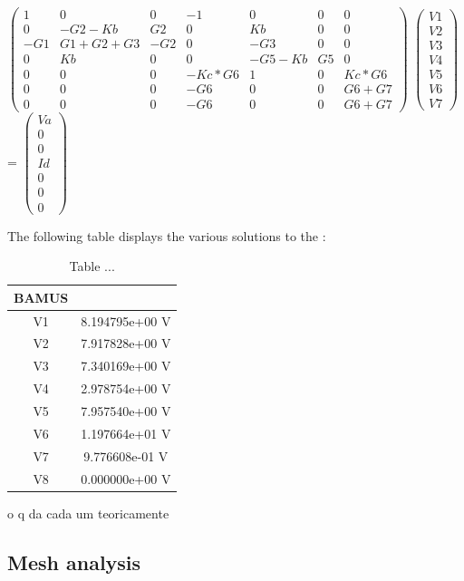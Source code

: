 $\begin{pmatrix}
1 & 0 & 0 & -1 & 0 & 0 & 0 \\
0 & -G2-Kb & G2 & 0 & Kb & 0 & 0 \\
-G1 & G1+G2+G3 & -G2 & 0 & -G3 & 0 & 0 \\
0 & Kb & 0 & 0 & -G5-Kb & G5 & 0 \\
0 & 0 & 0 & -Kc*G6 & 1 & 0 & Kc*G6 \\
0 & 0 & 0 & -G6 & 0 & 0 & G6+G7 \\
0 & 0 & 0 & -G6 & 0 & 0 & G6+G7 
\end{pmatrix}$
$\begin{pmatrix}
V1\\
V2\\
V3\\
V4\\
V5\\
V6\\
V7
\end{pmatrix}$
=
$\begin{pmatrix}
Va\\
0\\
0\\
Id\\
0\\
0\\
0
\end{pmatrix}$


The following table displays the various solutions to the :

\begin{table}[ht]
\centering
\begin{tabular}{c|c} 
 \hline
 BAMUS\\ [0.5ex] 
 \hline\hline
V1 & 8.194795e+00 V\\ \hline
V2 & 7.917828e+00 V\\ \hline
V3 & 7.340169e+00 V\\ \hline
V4 & 2.978754e+00 V\\ \hline
V5 & 7.957540e+00 V\\ \hline
V6 & 1.197664e+01 V\\ \hline
V7 & 9.776608e-01 V\\ \hline
V8 & 0.000000e+00 V\\ \hline 
\end{tabular}
\caption{Table ...}
\label{table:2}
\end{table}

o q da cada um teoricamente

\subsection{Mesh analysis}

